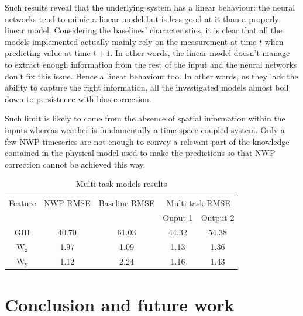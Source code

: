 \documentclass{article}
\newcommand{\saut}{\vspace{10px}}
\begin{document}
Such results reveal that the underlying system has a linear behaviour: the neural networks tend to mimic
a linear model but is less good at it than a properly linear model. Considering the baselines' characteristics,
it is clear that all the models implemented actually mainly rely on the measurement
at time $t$ when predicting value at time $t + 1$. In other
words, the linear model doesn't manage to extract enough information from the rest of the input and the neural
networks don't fix this issue. Hence a linear behaviour too. In other words,
as they lack the ability to capture the
right information, all the investigated models almost boil down to persistence with bias correction.

\saut

Such limit is likely to come from the absence of spatial information within the inputs whereas weather is fundamentally
a time-space coupled system. Only a few NWP timeseries are not enough to convey a relevant 
part of the knowledge contained in the physical model used to make the predictions so that NWP correction cannot
be achieved this way.

\vspace{20px}

\begin{table}[htb]\centering
\begin{tabular}{ccccc}
\toprule
      Feature&NWP RMSE&Baseline RMSE&\multicolumn{2}{c}{Multi-task RMSE}\\\cmidrule{4-5}
      &	 &	&	Ouput 1	&Output 2\\ \midrule
      GHI	&40.70&61.03&	44.32&54.38\\
      $\mathrm W_{\mathrm x}$	&1.97&1.09&1.13&1.36\\
      $\mathrm W_{\mathrm y}$	&1.12&2.24&1.16&1.43\\
      \bottomrule
\end{tabular}
\caption{Multi-task models results}
\label{tab:results}
\end{table}

\section*{Conclusion and future work}
\end{document}
